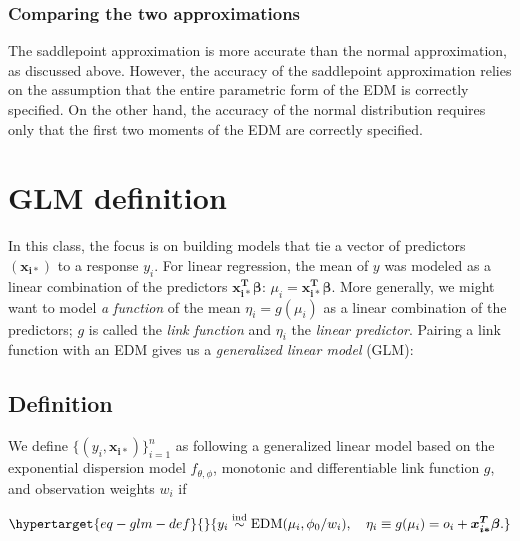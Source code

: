 \documentclass[
  11pt,
  letterpaper,
  oneside]{book}
\theoremstyle{plain}
\theoremstyle{plain}
\theoremstyle{definition}
\theoremstyle{definition}
\theoremstyle{plain}
\theoremstyle{remark}
\begin{document}
\hypertarget{comparing-the-two-approximations}{%
\subsection{Comparing the two
approximations}\label{comparing-the-two-approximations}}

The saddlepoint approximation is more accurate than the normal
approximation, as discussed above. However, the accuracy of the
saddlepoint approximation relies on the assumption that the entire
parametric form of the EDM is correctly specified. On the other hand,
the accuracy of the normal distribution requires only that the first two
moments of the EDM are correctly specified.

\hypertarget{sec-glm-def}{%
\chapter{GLM definition}\label{sec-glm-def}}

In this class, the focus is on building models that tie a vector of
predictors \((\boldsymbol{x_{i*}})\) to a response \(y_i\). For linear
regression, the mean of \(y\) was modeled as a linear combination of the
predictors \(\boldsymbol{x_{i*}^T} \boldsymbol{\beta}\):
\(\mu_i = \boldsymbol{x_{i*}^T} \boldsymbol{\beta}\). More generally, we
might want to model \emph{a function} of the mean \(\eta_i = g(\mu_i)\)
as a linear combination of the predictors; \(g\) is called the
\emph{link function} and \(\eta_i\) the \emph{linear predictor}. Pairing
a link function with an EDM gives us a \emph{generalized linear model}
(GLM):

\hypertarget{definition-1}{%
\section{Definition}\label{definition-1}}

We define \(\{(y_i, \boldsymbol{x_{i*}})\}_{i = 1}^n\) as following a
generalized linear model based on the exponential dispersion model
\(f_{\theta, \phi}\), monotonic and differentiable link function \(g\),
and observation weights \(w_i\) if

\begin{equation}\protect\hypertarget{eq-glm-def}{}{
y_i \overset{\text{ind}} \sim \text{EDM}(\mu_i, \phi_0/w_i), \quad \eta_i \equiv g(\mu_i) = o_i + \boldsymbol{x^T_{i*}}\boldsymbol{\beta}.
}\label{eq-glm-def}\end{equation}
\end{document}
